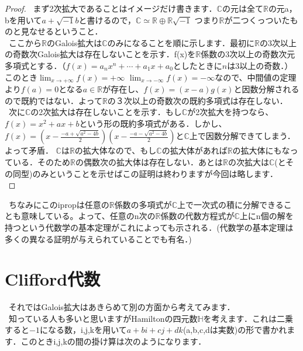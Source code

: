 \documentclass{jreport}
\theoremstyle{idefinition}
\begin{document}
\begin{proof}
\ まず2次拡大であることはイメージだけ書きます．$\mathbb{C}$の元は全て$\mathbb{R}$の元a，bを用いて$a+\sqrt{-1} b$と書けるので，$\mathbb{C} \simeq \mathbb{R} \oplus \mathbb{R} \sqrt{-1}$ つまり$\mathbb{R}$が二つくっついたものと見なせるということ．\\
\ ここから$\mathbb{R}$のGalois拡大は$\mathbb{C}$のみになることを順に示します．最初に$\mathbb{R}$の3次以上の奇数次Galois拡大は存在しないことを示す．f(x)を$\mathbb{R}$係数の3次以上の奇数次元多項式とする．（$f(x)=a_nx^n+\cdots +a_1x+a_0$としたときに$n$は3以上の奇数．）このとき$\displaystyle \lim_{x \to +\infty} f(x)=+\infty$ $\displaystyle \lim_{x \to -\infty} f(x)=-\infty$なので、中間値の定理より$f(a)=0$となる$a\in \mathbb{R}$が存在し、$f(x)=(x-a)g(x)$と因数分解されるので既約ではない．よって$\mathbb{R}$の３次以上の奇数次の既約多項式は存在しない．\\
\ 次に$\mathbb{C}$の2次拡大は存在しないことを示す．もし$\mathbb{C}$が2次拡大を持つなら、$f(x)=x^2+ax+b$という形の既約多項式がある．しかし、$f(x)=(x-\frac{-a+\sqrt{a^2-4b}}{2})(x-\frac{-a-\sqrt{a^2-4b}}{2})$と$\mathbb{C}$上で因数分解できてしまう．よって矛盾． $\mathbb{C}$は$\mathbb{R}$の拡大体なので、もし$\mathbb{C}$の拡大体があれば$\mathbb{R}$の拡大体にもなっている．そのため$\mathbb{R}$の偶数次の拡大体は存在しない．あとは$\mathbb{R}$の次拡大は$\mathbb{C}$(とその同型)のみということを示せばこの証明は終わりますが今回は略します．\\
\end{proof}

\ ちなみにこのipropは任意の$\mathbb{R}$係数の多項式が$\mathbb{C}$上で一次式の積に分解できることも意味している。よって、任意のn次の$\mathbb{R}$係数の代数方程式が$\mathbb{C}$上にn個の解を持つという代数学の基本定理がこれによっても示される．(代数学の基本定理は多くの異なる証明が与えられていることでも有名．)\\


\newpage

\section{Clifford代数}

\ それではGalois拡大はあきらめて別の方面から考えてみます．\\
\ 知っている人も多いと思いますがHamiltonの四元数$\mathbb{H}$を考えます．これは二乗すると$-1$になる数，i,j,kを用いて$a+bi+cj+dk$(a,b,c,dは実数)の形で書かれます．このときi,j,kの間の掛け算は次のようになります．\\
\end{document}

